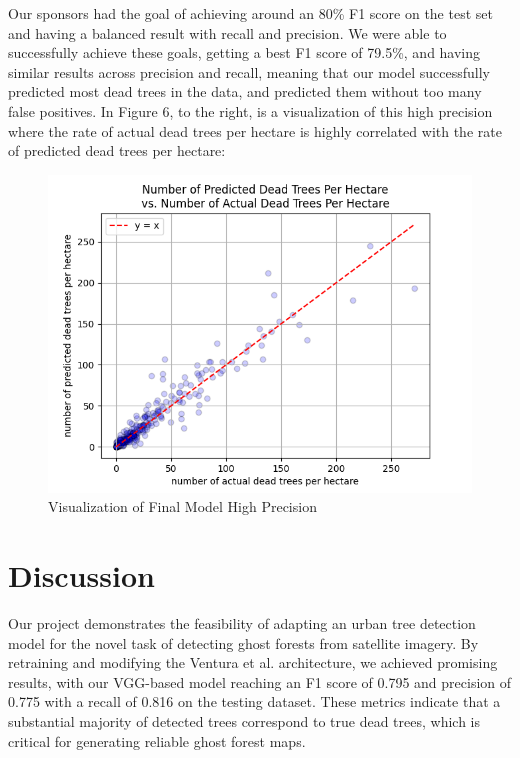 \documentclass[conference]{ieeetran}
\begin{document}
Our sponsors had the goal of achieving around an 80\% F1 score on the test set and having a balanced result with recall and precision. We were able to successfully achieve these goals, getting a best F1 score of 79.5\%, and having similar results across precision and recall, meaning that our model successfully predicted most dead trees in the data, and predicted them without too many false positives. In Figure 6, to the right, is a visualization of this high precision where the rate of actual dead trees per hectare is highly correlated with the rate of predicted dead trees per hectare:

\begin{figure}[htbp]
  \centering
  \includegraphics[width=\linewidth]{scatter_plot.png}
  \caption{Visualization of Final Model High Precision}
  \label{fig:my_label}
\end{figure}
\FloatBarrier




\section{Discussion}
Our project demonstrates the feasibility of adapting an urban tree detection model for the novel task of detecting ghost forests from satellite imagery. By retraining and modifying the Ventura et al. architecture, we achieved promising results, with our VGG-based model reaching an F1 score of 0.795 and precision of 0.775 with a recall of 0.816 on the testing dataset. These metrics indicate that a substantial majority of detected trees correspond to true dead trees, which is critical for generating reliable ghost forest maps. 
\end{document}
